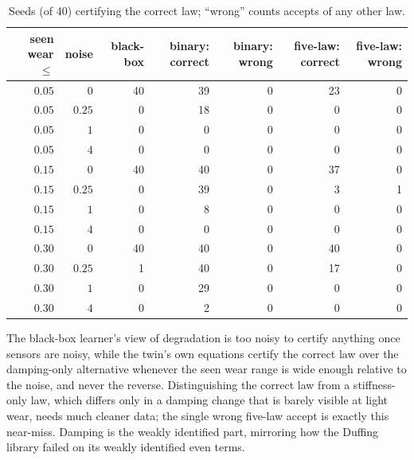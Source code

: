 \begin{table}[h]
\centering\small
\caption{Seeds (of 40) certifying the correct law; ``wrong'' counts accepts of any other law.}
\label{tab:twin-screen}
\setlength{\tabcolsep}{5pt}
\begin{tabular}{rrrrrrr}
\toprule
seen wear $\le$ & noise & black-box & binary: correct & binary: wrong & five-law: correct & five-law: wrong\\
\midrule
$0.05$ & $0$ & 40 & 39 & 0 & 23 & 0 \\
$0.05$ & $0.25$ & 0 & 18 & 0 & 0 & 0 \\
$0.05$ & $1$ & 0 & 0 & 0 & 0 & 0 \\
$0.05$ & $4$ & 0 & 0 & 0 & 0 & 0 \\
$0.15$ & $0$ & 40 & 40 & 0 & 37 & 0 \\
$0.15$ & $0.25$ & 0 & 39 & 0 & 3 & 1 \\
$0.15$ & $1$ & 0 & 8 & 0 & 0 & 0 \\
$0.15$ & $4$ & 0 & 0 & 0 & 0 & 0 \\
$0.30$ & $0$ & 40 & 40 & 0 & 40 & 0 \\
$0.30$ & $0.25$ & 1 & 40 & 0 & 17 & 0 \\
$0.30$ & $1$ & 0 & 29 & 0 & 0 & 0 \\
$0.30$ & $4$ & 0 & 2 & 0 & 0 & 0 \\
\bottomrule
\end{tabular}
\end{table}
The black-box learner's view of degradation is too noisy to certify anything once sensors are noisy, while the twin's own equations certify the correct law over the damping-only alternative whenever the seen wear range is wide enough relative to the noise, and never the reverse. Distinguishing the correct law from a stiffness-only law, which differs only in a damping change that is barely visible at light wear, needs much cleaner data; the single wrong five-law accept is exactly this near-miss. Damping is the weakly identified part, mirroring how the Duffing library failed on its weakly identified even terms.


